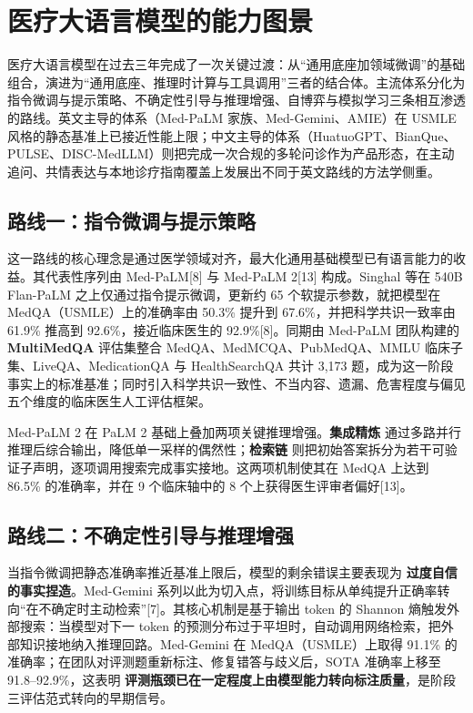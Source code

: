 \section{医疗大语言模型的能力图景}

医疗大语言模型在过去三年完成了一次关键过渡：从“通用底座加领域微调”的基础组合，演进为“通用底座、推理时计算与工具调用”三者的结合体。主流体系分化为指令微调与提示策略、不确定性引导与推理增强、自博弈与模拟学习三条相互渗透的路线。英文主导的体系（Med-PaLM 家族、Med-Gemini、AMIE）在 USMLE 风格的静态基准上已接近性能上限；中文主导的体系（HuatuoGPT、BianQue、PULSE、DISC-MedLLM）则把完成一次合规的多轮问诊作为产品形态，在主动追问、共情表达与本地诊疗指南覆盖上发展出不同于英文路线的方法学侧重。

\subsection{路线一：指令微调与提示策略}

这一路线的核心理念是通过医学领域对齐，最大化通用基础模型已有语言能力的收益。其代表性序列由 Med-PaLM[8] 与 Med-PaLM 2[13] 构成。Singhal 等在 540B Flan-PaLM 之上仅通过指令提示微调，更新约 65 个软提示参数，就把模型在 MedQA（USMLE）上的准确率由 50.3\% 提升到 67.6\%，并把科学共识一致率由 61.9\% 推高到 92.6\%，接近临床医生的 92.9\%[8]。同期由 Med-PaLM 团队构建的 \textbf{MultiMedQA} 评估集整合 MedQA、MedMCQA、PubMedQA、MMLU 临床子集、LiveQA、MedicationQA 与 HealthSearchQA 共计 3,173 题，成为这一阶段事实上的标准基准；同时引入科学共识一致性、不当内容、遗漏、危害程度与偏见五个维度的临床医生人工评估框架。

Med-PaLM 2 在 PaLM 2 基础上叠加两项关键推理增强。\textbf{集成精炼} 通过多路并行推理后综合输出，降低单一采样的偶然性；\textbf{检索链} 则把初始答案拆分为若干可验证子声明，逐项调用搜索完成事实接地。这两项机制使其在 MedQA 上达到 86.5\% 的准确率，并在 9 个临床轴中的 8 个上获得医生评审者偏好[13]。

\subsection{路线二：不确定性引导与推理增强}

当指令微调把静态准确率推近基准上限后，模型的剩余错误主要表现为 \textbf{过度自信的事实捏造}。Med-Gemini 系列以此为切入点，将训练目标从单纯提升正确率转向“在不确定时主动检索”[7]。其核心机制是基于输出 token 的 Shannon 熵触发外部搜索：当模型对下一 token 的预测分布过于平坦时，自动调用网络检索，把外部知识接地纳入推理回路。Med-Gemini 在 MedQA（USMLE）上取得 91.1\% 的准确率；在团队对评测题重新标注、修复错答与歧义后，SOTA 准确率上移至 91.8--92.9\%，这表明 \textbf{评测瓶颈已在一定程度上由模型能力转向标注质量}，是阶段三评估范式转向的早期信号。

